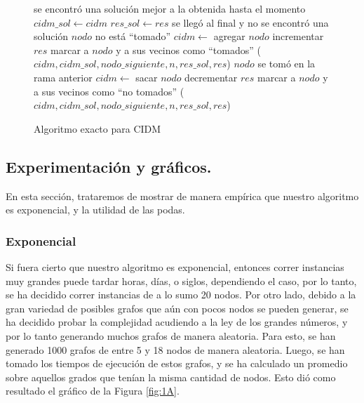 \begin{figure}
\begin{codebox}
\li \If se encontró una solución mejor a la obtenida hasta el momento
\li \Then 
 		$cidm\_sol \leftarrow cidm$
\li 		$res\_sol \leftarrow res$ 		
\li 		\Return
	\End
\li \If se llegó al final y no se encontró una solución
\li \Then \Return
	\End
\li \If $nodo$ no está ``tomado''	
\li \Then
		$cidm \leftarrow$ agregar $nodo$
\li 		incrementar $res$
\li 		marcar a $nodo$ y a sus vecinos como ``tomados''
($cidm,cidm\_sol,nodo\_siguiente,n,res\_sol,res$)
	\End
\li 	\If $nodo$ se tomó en la rama anterior
\li 	\Then
		$cidm \leftarrow$ sacar $nodo$
\li		decrementar $res$
\li 		marcar a $nodo$ y a sus vecinos como ``no tomados''
	\End
{}($cidm,cidm\_sol,nodo\_siguiente,n,res\_sol,res$)
\end{codebox}
\caption{Algoritmo exacto para CIDM}\label{code:exacto}
\end{figure}

\vspace*{0.6cm}
\subsection{Experimentación y gráficos.}

\vspace*{0.3cm}
En esta sección, trataremos de mostrar de manera empírica que nuestro algoritmo es exponencial, y la utilidad de las podas.

\subsubsection{Exponencial}
\vspace*{0.3cm}

Si fuera cierto que nuestro algoritmo es exponencial, entonces correr instancias muy grandes puede tardar horas, días, o siglos, dependiendo el caso, por lo tanto, se ha decidido correr instancias de a lo sumo 20 nodos. Por otro lado, debido a la gran variedad de posibles grafos que aún con pocos nodos se pueden generar, se ha decidido probar la complejidad acudiendo a la ley de los grandes números, y por lo tanto generando muchos grafos de manera aleatoria. Para esto, se han generado 1000 grafos de entre 5 y 18 nodos de manera aleatoria. Luego, se han tomado los tiempos de ejecución de estos grafos, y se ha calculado un promedio sobre aquellos grados que tenían la misma cantidad de nodos. Esto dió como resultado el gráfico de la Figura \ref{fig:1A}.

